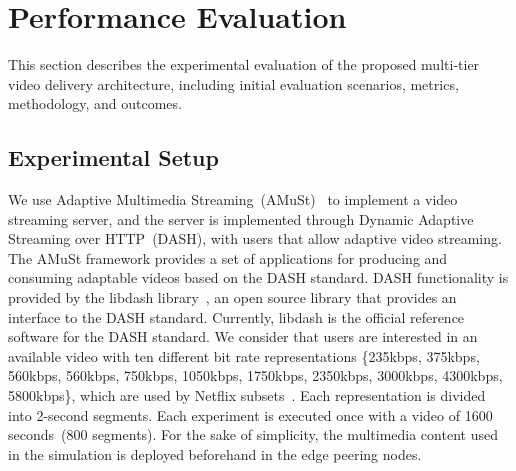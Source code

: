 \section{Performance Evaluation}
\label{sec:results}

This section describes the experimental evaluation of the proposed multi-tier video delivery architecture, including initial evaluation scenarios, metrics, methodology, and outcomes.
 
%

\subsection{Experimental Setup}


We use Adaptive Multimedia Streaming~(AMuSt)~\cite{kreuzberger2016amust} to implement a video streaming server, and the server is implemented through Dynamic Adaptive Streaming over HTTP~(DASH), with users that allow adaptive video streaming. The AMuSt framework provides a set of applications for producing and consuming adaptable videos based on the DASH standard. DASH functionality is provided by the libdash library~\cite{mueller2013ICMEW}, an open source library that provides an interface to the DASH standard. Currently, libdash is the official reference software for the DASH standard. We consider that users are interested in an available video with ten different bit rate representations \{235kbps, 375kbps, 560kbps, 560kbps, 750kbps, 1050kbps, 1750kbps, 2350kbps, 3000kbps, 4300kbps, 5800kbps\}, which are used by Netflix subsets~\cite{netflix:representation}. Each representation is divided into 2-second segments. Each experiment is executed once with a video of 1600 seconds~(800 segments). 
For the sake of simplicity, the multimedia content used in the simulation is deployed beforehand in the edge peering nodes. 

